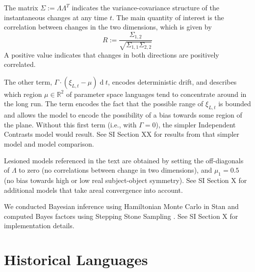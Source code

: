 \documentclass[11pt,a4paper]{article}
\begin{document}
The matrix $\Sigma := \Lambda\Lambda^T$ indicates the variance-covariance structure of the instantaneous changes at any time $t$.
The main quantity of interest is the correlation between changes in the two dimensions, which is given by
\begin{equation}
R := \frac{\Sigma_{1,2}}{\sqrt{\Sigma_{1,1}\Sigma_{2,2}}}
\end{equation}
A positive value indicates that changes in both directions are positively correlated.

The other term, $\Gamma \cdot (\xi_{L,t}-\mu) \operatorname{d}t$, encodes deterministic drift, and describes which region $\mu \in \mathbb{R}^2$ of parameter space languages tend to concentrate around in the long run.
The term encodes the fact that the possible range of $\xi_{L,t}$ is bounded and allows the model to encode the possibility of a bias towards some region of the plane.
Without this first term (i.e., with $\Gamma =0$), the simpler Independent Contrasts model \citep{felsenstein1973maximum,freckleton2012fast} would result. See SI Section XX for results from that simpler model and model comparison.

Lesioned models referenced in the text are obtained by setting the off-diagonals of $\Lambda$ to zero (no correlations between change in two dimensions), and $\mu_1=0.5$ (no bias towards high or low real subject-object symmetry).
See SI Section X for additional models that take areal convergence into account.

We conducted Bayesian inference using Hamiltonian Monte Carlo in Stan \citep{homan2014the,carpenter2017stan} and computed Bayes factors using Stepping Stone Sampling \citep{xie2011improving}.
See SI Section X for implementation details.







\appendix

\section{Historical Languages}
\end{document}
